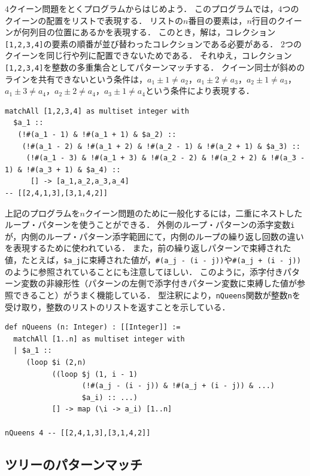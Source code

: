 $4$クイーン問題をとくプログラムからはじめよう．
このプログラムでは，$4$つのクイーンの配置をリストで表現する．
リストの$n$番目の要素は，$n$行目のクイーンが何列目の位置にあるかを表現する．
このとき，解は，コレクション\lstinline|[1,2,3,4]|の要素の順番が並び替わったコレクションである必要がある．
$2$つのクイーンを同じ行や列に配置できないためである．
それゆえ，コレクション\lstinline|[1,2,3,4]|を整数の多重集合としてパターンマッチする．
クイーン同士が斜めのラインを共有できないという条件は，$a_1 \pm 1 \neq a_2$，$a_1 \pm 2 \neq a_3$，$a_2 \pm 1 \neq a_3$，$a_1 \pm 3 \neq a_4$，$a_2 \pm 2 \neq a_4$，$a_3 \pm 1 \neq a_4$という条件により表現する．
\begin{lstlisting}[language=egison,numbers=none]
matchAll [1,2,3,4] as multiset integer with
  $a_1 ::
   (!#(a_1 - 1) & !#(a_1 + 1) & $a_2) ::
    (!#(a_1 - 2) & !#(a_1 + 2) & !#(a_2 - 1) & !#(a_2 + 1) & $a_3) ::
     (!#(a_1 - 3) & !#(a_1 + 3) & !#(a_2 - 2) & !#(a_2 + 2) & !#(a_3 - 1) & !#(a_3 + 1) & $a_4) ::
      [] -> [a_1,a_2,a_3,a_4]
-- [[2,4,1,3],[3,1,4,2]]
\end{lstlisting}
上記のプログラムを$n$クイーン問題のために一般化するには，二重にネストしたループ・パターンを使うことができる．
外側のループ・パターンの添字変数\lstinline|i|が，内側のループ・パターン添字範囲にて，内側のループの繰り返し回数の違いを表現するために使われている．
また，前の繰り返しパターンで束縛された値，たとえば，\lstinline|$a_j|に束縛された値が，\lstinline|#(a_j - (i - j))|や\lstinline|#(a_j + (i - j))|のように参照されていることにも注意してほしい．
このように，添字付きパターン変数の非線形性（パターンの左側で添字付きパターン変数に束縛した値が参照できること）がうまく機能している．
型注釈により，\lstinline{nQueens}関数が整数\lstinline{n}を受け取り，整数のリストのリストを返すことを示している．
\begin{lstlisting}[language=egison,numbers=none]
def nQueens (n: Integer) : [[Integer]] :=
  matchAll [1..n] as multiset integer with
  | $a_1 ::
     (loop $i (2,n)
           ((loop $j (1, i - 1)
                  (!#(a_j - (i - j)) & !#(a_j + (i - j)) & ...)
                  $a_i) :: ...)
           [] -> map (\i -> a_i) [1..n]

nQueens 4 -- [[2,4,1,3],[3,1,4,2]]
\end{lstlisting}

\subsection{ツリーのパターンマッチ}\label{pmo-tree}

